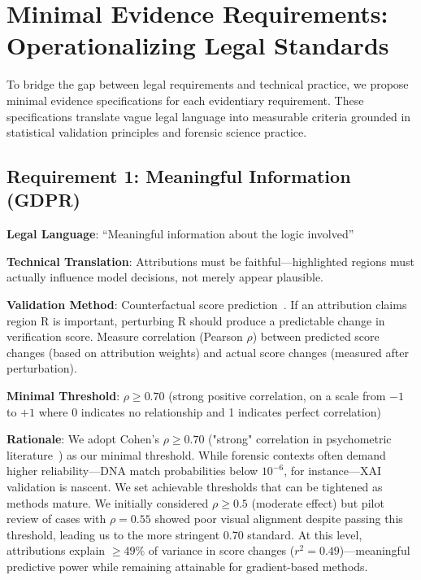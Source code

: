 \section{Minimal Evidence Requirements: Operationalizing Legal Standards}

To bridge the gap between legal requirements and technical practice, we propose minimal evidence specifications for each evidentiary requirement. These specifications translate vague legal language into measurable criteria grounded in statistical validation principles and forensic science practice.

\subsection{Requirement 1: Meaningful Information (GDPR)}

\textbf{Legal Language}: ``Meaningful information about the logic involved''~\cite{gdpr2016}

\textbf{Technical Translation}: Attributions must be faithful—highlighted regions must actually influence model decisions, not merely appear plausible.

\textbf{Validation Method}: Counterfactual score prediction~\cite{wachter2017counterfactual}. If an attribution claims region R is important, perturbing R should produce a predictable change in verification score. Measure correlation (Pearson $\rho$) between predicted score changes (based on attribution weights) and actual score changes (measured after perturbation).

\textbf{Minimal Threshold}: $\rho \geq 0.70$ (strong positive correlation, on a scale from $-1$ to $+1$ where 0 indicates no relationship and 1 indicates perfect correlation)

\textbf{Rationale}: We adopt Cohen's $\rho \geq 0.70$ ("strong" correlation in psychometric literature~\cite{cohen1988statistical}) as our minimal threshold. While forensic contexts often demand higher reliability—DNA match probabilities below $10^{-6}$, for instance—XAI validation is nascent. We set achievable thresholds that can be tightened as methods mature. We initially considered $\rho \geq 0.5$ (moderate effect) but pilot review of cases with $\rho = 0.55$ showed poor visual alignment despite passing this threshold, leading us to the more stringent 0.70 standard. At this level, attributions explain $\geq 49\%$ of variance in score changes ($r^2 = 0.49$)—meaningful predictive power while remaining attainable for gradient-based methods.

